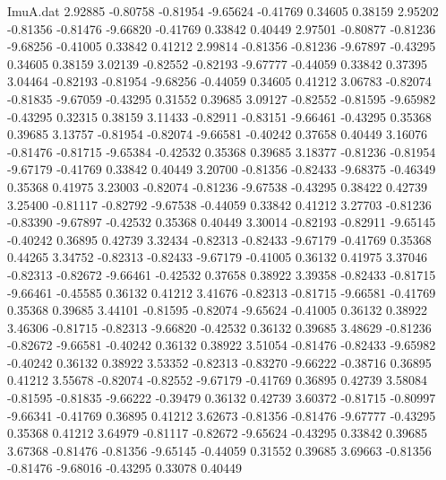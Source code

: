 \begin{filecontents}{ImuA.dat}
   2.92885   -0.80758   -0.81954   -9.65624   -0.41769    0.34605    0.38159
   2.95202   -0.81356   -0.81476   -9.66820   -0.41769    0.33842    0.40449
   2.97501   -0.80877   -0.81236   -9.68256   -0.41005    0.33842    0.41212
   2.99814   -0.81356   -0.81236   -9.67897   -0.43295    0.34605    0.38159
   3.02139   -0.82552   -0.82193   -9.67777   -0.44059    0.33842    0.37395
   3.04464   -0.82193   -0.81954   -9.68256   -0.44059    0.34605    0.41212
   3.06783   -0.82074   -0.81835   -9.67059   -0.43295    0.31552    0.39685
   3.09127   -0.82552   -0.81595   -9.65982   -0.43295    0.32315    0.38159
   3.11433   -0.82911   -0.83151   -9.66461   -0.43295    0.35368    0.39685
   3.13757   -0.81954   -0.82074   -9.66581   -0.40242    0.37658    0.40449
   3.16076   -0.81476   -0.81715   -9.65384   -0.42532    0.35368    0.39685
   3.18377   -0.81236   -0.81954   -9.67179   -0.41769    0.33842    0.40449
   3.20700   -0.81356   -0.82433   -9.68375   -0.46349    0.35368    0.41975
   3.23003   -0.82074   -0.81236   -9.67538   -0.43295    0.38422    0.42739
   3.25400   -0.81117   -0.82792   -9.67538   -0.44059    0.33842    0.41212
   3.27703   -0.81236   -0.83390   -9.67897   -0.42532    0.35368    0.40449
   3.30014   -0.82193   -0.82911   -9.65145   -0.40242    0.36895    0.42739
   3.32434   -0.82313   -0.82433   -9.67179   -0.41769    0.35368    0.44265
   3.34752   -0.82313   -0.82433   -9.67179   -0.41005    0.36132    0.41975
   3.37046   -0.82313   -0.82672   -9.66461   -0.42532    0.37658    0.38922
   3.39358   -0.82433   -0.81715   -9.66461   -0.45585    0.36132    0.41212
   3.41676   -0.82313   -0.81715   -9.66581   -0.41769    0.35368    0.39685
   3.44101   -0.81595   -0.82074   -9.65624   -0.41005    0.36132    0.38922
   3.46306   -0.81715   -0.82313   -9.66820   -0.42532    0.36132    0.39685
   3.48629   -0.81236   -0.82672   -9.66581   -0.40242    0.36132    0.38922
   3.51054   -0.81476   -0.82433   -9.65982   -0.40242    0.36132    0.38922
   3.53352   -0.82313   -0.83270   -9.66222   -0.38716    0.36895    0.41212
   3.55678   -0.82074   -0.82552   -9.67179   -0.41769    0.36895    0.42739
   3.58084   -0.81595   -0.81835   -9.66222   -0.39479    0.36132    0.42739
   3.60372   -0.81715   -0.80997   -9.66341   -0.41769    0.36895    0.41212
   3.62673   -0.81356   -0.81476   -9.67777   -0.43295    0.35368    0.41212
   3.64979   -0.81117   -0.82672   -9.65624   -0.43295    0.33842    0.39685
   3.67368   -0.81476   -0.81356   -9.65145   -0.44059    0.31552    0.39685
   3.69663   -0.81356   -0.81476   -9.68016   -0.43295    0.33078    0.40449

\end{filecontents}
